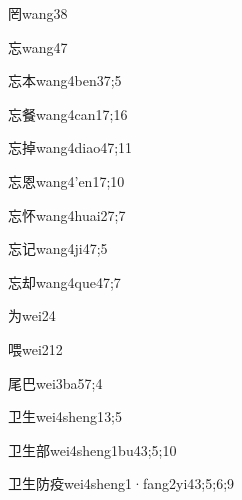 \begin{verbete}{罔}{wang3}{8}
\end{verbete}
\begin{verbete}{忘}{wang4}{7}
\end{verbete}
\begin{verbete}{忘本}{wang4ben3}{7;5}
\end{verbete}
\begin{verbete}{忘餐}{wang4can1}{7;16}
\end{verbete}
\begin{verbete}{忘掉}{wang4diao4}{7;11}
\end{verbete}
\begin{verbete}{忘恩}{wang4'en1}{7;10}
\end{verbete}
\begin{verbete}{忘怀}{wang4huai2}{7;7}
\end{verbete}
\begin{verbete}{忘记}{wang4ji4}{7;5}
\end{verbete}
\begin{verbete}{忘却}{wang4que4}{7;7}
\end{verbete}
\begin{verbete}{为}{wei2}{4}
\end{verbete}
\begin{verbete}{喂}{wei2}{12}
\end{verbete}
\begin{verbete}{尾巴}{wei3ba5}{7;4}
\end{verbete}
\begin{verbete}{卫生}{wei4sheng1}{3;5}
\end{verbete}
\begin{verbete}{卫生部}{wei4sheng1bu4}{3;5;10}
\end{verbete}
\begin{verbete}{卫生防疫}{wei4sheng1·fang2yi4}{3;5;6;9}
\end{verbete}
